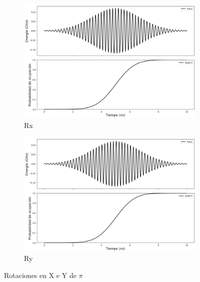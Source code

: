 \begin{figure}[H]
    \centering
    \begin{subfigure}[m]{0.49\textwidth}
        \centering \includegraphics[width=1\linewidth]{img/rx0pi.png}
        \caption{Rx}
    \end{subfigure}
    \begin{subfigure}[m]{0.49\textwidth}
        \centering \includegraphics[width=1\linewidth]{img/ry0pi.png}
        \caption{Ry}
    \end{subfigure}
    \caption[Rotaciones en X e Y de $\pi$]{Rotaciones en X e Y de $\pi$}
\label{fig:rxry0pi}
\end{figure}

